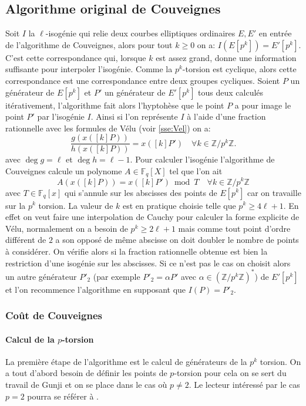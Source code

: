 \documentclass[10pt,a4paper]{book}
\theoremstyle{plain}
\theoremstyle{definition}
\theoremstyle{definition}
\theoremstyle{definition}
\theoremstyle{definition}
\theoremstyle{remark}
\theoremstyle{remark}
\begin{document}
\subsection{Algorithme original de Couveignes}
Soit $I$ la $\ell$-isogénie qui relie deux courbes elliptiques ordinaires $E,E'$ en entrée de l'algorithme de Couveignes, alors pour tout $k \geqslant 0$ on a: $I(E[p^k])=E'[p^k]$.
C'est cette correspondance qui, lorsque $k$ est assez grand, donne une information suffisante pour interpoler l'isogénie. Comme la $p^k$-torsion est cyclique, alors cette correspondance est une correspondance entre deux groupes cycliques. Soient $P$ un générateur de $E[p^k]$ et $P'$ un générateur de $E'[p^k]$ tous deux calculés itérativement, l'algorithme fait alors l'hyptohèse que le point $P$ a pour image le point $P'$ par l'isogénie $I$. Ainsi si l'on représente $I$ à l'aide d'une fraction rationnelle avec les formules de Vélu (voir \ref{sse:Vel}) on a:
\begin{equation}
\frac{g(x([k] P))}{h(x([k] P))}=x([k] P') \quad \forall k \in \mathbb{Z}/p^{k}\mathbb{Z}.
\end{equation}
avec $\deg g = \ell$ et $\deg h = \ell-1$.
Pour calculer l'isogénie l'algorithme de Couveignes calcule un polynome $A \in \mathbb{F}_q[X]$ tel que l'on ait 
\begin{equation}
A(x([k] P))= x([k] P') \bmod T \quad \forall k \in \mathbb{Z}/p^{k}\mathbb{Z}
\end{equation} 
avec $T \in \mathbb{F}_q[x]$ qui s'annule sur les abscisses des points de $E[p^k]$ car on travaille sur la $p^k$ torsion. La valeur de $k$ est en pratique choisie telle que $p^k \geqslant 4 \ell+1$. En effet on veut faire une interpolation de Cauchy pour calculer la forme explicite de Vélu, normalement on a besoin de $p^k \geqslant 2 \ell +1$ mais comme tout point d'ordre différent de $2$ a son opposé de même abscisse on doit doubler le nombre de points à considérer. On vérifie alors si la fraction rationnelle obtenue est bien la restriction d'une isogénie sur les abscisses. Si ce n'est pas le cas on choisit alors un autre générateur $P'_2$ (par exemple $P'_2=\alpha P'$ avec $\alpha \in \left( \mathbb{Z}/p^k \mathbb{Z} \right)^* $) de $E'[p^k]$ et l'on recommence l'algorithme en supposant que $I(P)=P'_2$.

\subsubsection{Coût de Couveignes}

\paragraph{Calcul de la $p$-torsion}
La première étape de l'algorithme est le calcul de générateurs de la $p^k$ torsion. On a tout d'abord besoin de définir les points de $p$-torsion pour cela on se sert du travail de Gunji \cite{Gunji76} et on se place dans le cas où $p \neq 2$. Le lecteur intéressé par le cas $p=2$ pourra se référer à \cite[3.2]{DeFeo11}.
\end{document}
